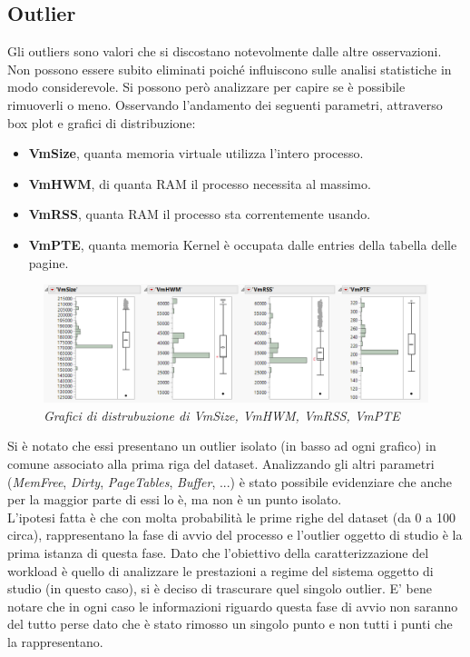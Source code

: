 \subsection{Outlier}
Gli outliers sono valori che si discostano notevolmente dalle altre osservazioni. Non possono essere subito eliminati poiché influiscono sulle analisi statistiche in modo considerevole. Si possono però analizzare per capire se è possibile rimuoverli o meno.
Osservando l'andamento dei seguenti parametri, attraverso box plot e grafici di distribuzione:
\begin{itemize}
	\item \textbf{VmSize}, quanta memoria virtuale utilizza l'intero processo.
	\item \textbf{VmHWM}, di quanta RAM il processo necessita al massimo.
	\item \textbf{VmRSS}, quanta RAM il processo sta correntemente usando.
	\item \textbf{VmPTE}, quanta memoria Kernel è occupata dalle entries della tabella delle pagine.
\end{itemize}
\begin{figure}[H]
	\centering
	\includegraphics[width=1\textwidth]{img/hw1/outlier_vm.png}
	\caption{\textit{Grafici di distrubuzione di VmSize, VmHWM, VmRSS, VmPTE}}
\end{figure}
Si è notato che essi presentano un outlier isolato (in basso ad ogni grafico) in comune associato alla prima riga del dataset. Analizzando gli altri parametri (\textit{MemFree}, \textit{Dirty}, \textit{PageTables}, \textit{Buffer}, ...) è stato possibile evidenziare che anche per la maggior parte di essi lo è, ma non è un punto isolato. 
\\L'ipotesi fatta è che con molta probabilità le prime righe del dataset (da 0 a 100 circa), rappresentano la fase di avvio del processo e l'outlier oggetto di studio è la prima istanza di questa fase. Dato che l'obiettivo della caratterizzazione del workload è quello di analizzare le prestazioni a regime del sistema oggetto di studio (in questo caso), si è deciso di trascurare quel singolo outlier. E' bene notare che in ogni caso le informazioni riguardo questa fase di avvio non saranno del tutto perse dato che è stato rimosso un singolo punto e non tutti i punti che la rappresentano.
